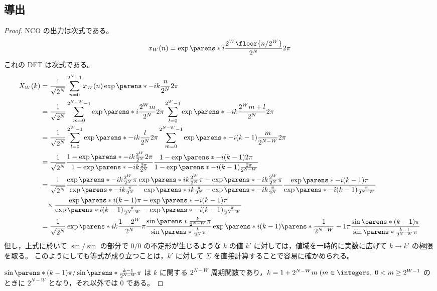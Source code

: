         \subsection{導出}
            \begin{proof}
                \quad\par
                NCO の出力は次式である。
                \[ x_W(n) = \exp\parens*{i\frac{2^W\floor{n/2^W}}{2^N}2\pi} \]
                これの DFT は次式である。
                \begin{align*}
                    X_W(k) &= \frac{1}{\sqrt{2^N}} \sum_{n=0}^{2^N-1} x_W(n)\exp\parens*{-ik\frac{n}{2^N}2\pi} \\
                    &= \frac{1}{\sqrt{2^N}} \sum_{m=0}^{2^{N-W}-1} \exp\parens*{i\frac{2^W m}{2^N}2\pi} \sum_{l=0}^{2^W-1} \exp\parens*{-ik\frac{2^W m + l}{2^N}2\pi} \\
                    &= \frac{1}{\sqrt{2^N}} \sum_{l=0}^{2^W-1} \exp\parens*{-ik\frac{l}{2^N}2\pi} \sum_{m=0}^{2^{N-W}-1} \exp\parens*{-i(k-1)\frac{m}{2^{N-W}}2\pi} \\
                    &= \frac{1}{\sqrt{2^N}} \frac{1-\exp\parens*{-ik\frac{2^W}{2^N}2\pi}}{1-\exp\parens*{-ik\frac{2\pi}{2^N}}}\frac{1-\exp\parens*{-i(k-1)2\pi}}{1-\exp\parens*{-i(k-1)\frac{2\pi}{2^{N-W}}}} \\
                    &= \frac{1}{\sqrt{2^N}}\frac{\exp\parens*{-ik\frac{2^W}{2^N}\pi}}{\exp\parens*{-ik\frac{\pi}{2^N}}}\frac{\exp\parens*{ik\frac{2^W}{2^N}\pi} - \exp\parens*{-ik\frac{2^W}{2^N}\pi}}{\exp\parens*{ik\frac{\pi}{2^N}} - \exp\parens*{-ik\frac{\pi}{2^N}}}\frac{\exp\parens*{-i(k-1)\pi}}{\exp\parens*{-i(k-1)\frac{\pi}{2^{N-W}}}} \\
                    &\phantom{=}\times\frac{\exp\parens*{i(k-1)\pi} - \exp\parens*{-i(k-1)\pi}}{\exp\parens*{i(k-1)\frac{\pi}{2^{N-W}}} - \exp\parens*{-i(k-1)\frac{\pi}{2^{N-W}}}} \\
                    &= \frac{1}{\sqrt{2^N}} \exp\parens*{ik\frac{1-2^W}{2^N}\pi}\frac{\sin\parens*{\frac{k}{2^{N-W}}\pi}}{\sin\parens*{\frac{k}{2^N}\pi}}\exp\parens*{i(k-1)\parens*{\frac{1}{2^{N-W}}-1}\pi}\frac{\sin\parens*{(k-1)\pi}}{\sin\parens*{\frac{k-1}{2^{N-W}}\pi}} %
                \end{align*}
                但し，上式に於いて $\sin/\sin$ の部分で $0/0$ の不定形が生じるような $k$ の値 $k'$ に対しては，値域を一時的に実数に広げて $k\to k'$ の極限を取る。
                このようにしても等式が成り立つことは，$k'$ に対して $\Sigma$ を直接計算することで容易に確かめられる。
                \par
                $\sin\parens*{(k-1)\pi}/\sin\parens*{\frac{k-1}{2^{N-W}}\pi}$ は $k$ に関する $2^{N-W}$ 周期関数であり，$k = 1 + 2^{N-W}m\;(m\in\integers,\;0<m\geq 2^{W-1}$ のときに $2^{N-W}$ となり，それ以外では 0 である。
            \end{proof}
